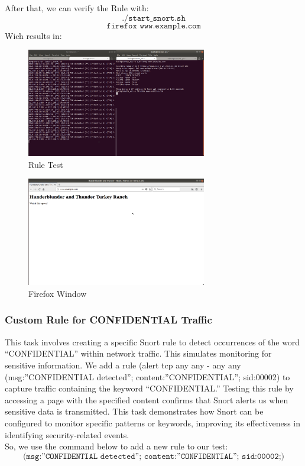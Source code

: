 \documentclass[a4paper,11pt]{article} %
\begin{document}
After that, we can verify the Rule with:
\[\texttt{./start\_snort.sh}\]
\[\texttt{firefox www.example.com}\]
Wich results in:

\begin{figure}[h!]
    \centering
    \includegraphics[width=0.7\textwidth]{images/18.png}
    \caption{Rule Test}
\end{figure}

\break 

\begin{figure}[h!]
    \centering
    \includegraphics[width=0.7\textwidth]{images/19.png}
    \caption{Firefox Window}
\end{figure}

\subsubsection{Custom Rule for CONFIDENTIAL Traffic}
This task involves creating a specific Snort rule to detect occurrences of the word “CONFIDENTIAL” within network traffic. This simulates monitoring for sensitive information. We add a rule (alert tcp any any -\> any any (msg:”CONFIDENTIAL detected”; content:”CONFIDENTIAL”; sid:00002) to capture traffic containing the keyword “CONFIDENTIAL.” Testing this rule by accessing a page with the specified content confirms that Snort alerts us when sensitive data is transmitted. This task demonstrates how Snort can be configured to monitor specific patterns or keywords, improving its effectiveness in identifying security-related events.\\
So, we use the command below to add a new rule to our test:
\[\texttt{(msg:”CONFIDENTIAL detected”; content:”CONFIDENTIAL”; sid:00002;)}\]
\end{document}
